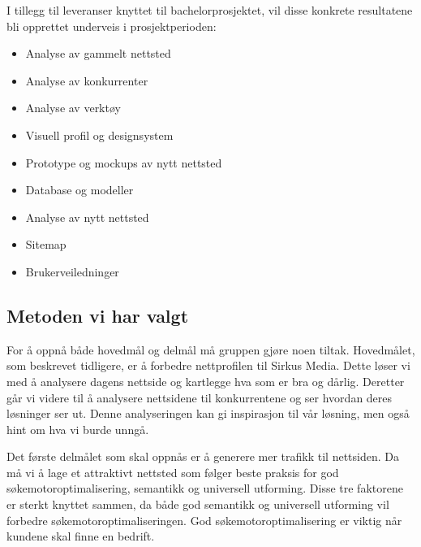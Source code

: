 
I tillegg til leveranser knyttet til bachelorprosjektet, vil disse konkrete resultatene bli opprettet underveis i prosjektperioden:
\begin{itemize}
\item Analyse av gammelt nettsted
\item Analyse av konkurrenter
\item Analyse av verktøy
\item Visuell profil og designsystem
\item Prototype og mockups av nytt nettsted
\item Database og modeller
\item Analyse av nytt nettsted
\item Sitemap
\item Brukerveiledninger
\end{itemize}

\subsection{Metoden vi har valgt}
\label{sec:metode}
For å oppnå både hovedmål og delmål må gruppen gjøre noen tiltak. Hovedmålet, som beskrevet tidligere, er å forbedre nettprofilen til Sirkus Media. Dette løser vi med å analysere dagens nettside og kartlegge hva som er bra og dårlig. Deretter går vi videre til å analysere nettsidene til konkurrentene og ser hvordan deres løsninger ser ut. Denne analyseringen kan gi inspirasjon til vår løsning, men også hint om hva vi burde unngå.

Det første delmålet som skal oppnås er å generere mer trafikk til nettsiden. Da må vi å lage et attraktivt nettsted som følger beste praksis for god søkemotoroptimalisering, semantikk og universell utforming. Disse tre faktorene er sterkt knyttet sammen, da både god semantikk og universell utforming vil forbedre søkemotoroptimaliseringen. God søkemotoroptimalisering er viktig når kundene skal finne en bedrift.

